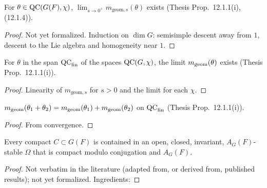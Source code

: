 \begin{lemma}
\label{tendsto_mGeomS_of_mem_QC}
\leanok
{}
For $\theta\in\mathrm{QC}(G(F),\chi)$, $\lim_{s\to0^+}m_{\mathrm{geom},s}(\theta)$ exists (Thesis Prop.~12.1.1(i), (12.1.4)).
\end{lemma}
\begin{proof}
Not yet formalized. Induction on $\dim G$: semisimple descent away from $1$, descent to the Lie algebra and homogeneity near $1$.
\end{proof}

\begin{proposition}
\label{tendsto_mGeomS}
\leanok
{}
For $\theta$ in the span $\mathrm{QC}_{\mathrm{fin}}$ of the spaces $\mathrm{QC}(G,\chi)$, the limit $m_{\mathrm{geom}}(\theta)$ exists
(Thesis Prop.~12.1.1(i)).
\end{proposition}
\begin{proof}
\leanok
{}
Linearity of $m_{\mathrm{geom},s}$ for $s>0$ and the limit for each $\chi$.
\end{proof}

\begin{proposition}
\label{mGeom_add}
\leanok
{}
$m_{\mathrm{geom}}(\theta_1+\theta_2)=m_{\mathrm{geom}}(\theta_1)+m_{\mathrm{geom}}(\theta_2)$ on $\mathrm{QC}_{\mathrm{fin}}$ (Thesis Prop.~12.1.1(i)).
\end{proposition}
\begin{proof}
\leanok
{}
From convergence.
\end{proof}

\begin{theorem}
\label{hc_exists_invariantClopen_superset}
\leanok
{}
Every compact $C\subset G(F)$ is contained in an open, closed, invariant, $A_G(F)$-stable $\Omega$ that is compact
modulo conjugation and $A_G(F)$.
\end{theorem}
\begin{proof}
Not verbatim in the literature (adapted from, or derived from, published results); not yet formalized. Ingredients: 
\end{proof}

